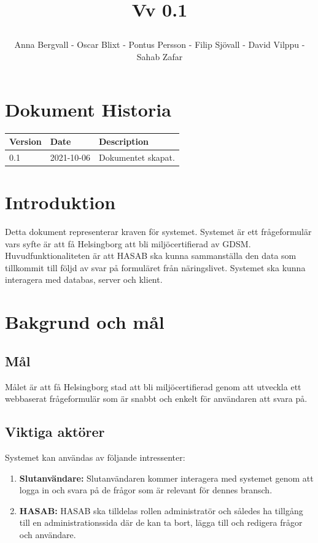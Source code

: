 \documentclass{article}
\date {#1}
\title {
    \documentNumber {01}    

    \documentTitle {Helsingborg Event and Convention Bureau}
    
    \documentDate {2021-08-20}
    \documentVersion Vv 0.1
    
    \author{Anna Bergvall - Oscar Blixt - Pontus Persson - Filip Sjövall - David Vilppu - Sahab Zafar}
}
\begin{document}
\maketitle

\thispagestyle{empty}



\newpage

\tableofcontents


\newpage

\section{Dokument Historia}
\begin{tabular}{ l | l | l }
    Version & Date & Description \\
    \hline
    0.1 & 2021-10-06 & Dokumentet skapat. \\
    
\end{tabular}

\section{Introduktion}
    Detta dokument representerar kraven för systemet. Systemet är ett frågeformulär vars syfte är att få Helsingborg att bli miljöcertifierad av GDSM. Huvudfunktionaliteten är att HASAB ska kunna sammanställa den data som tillkommit till följd av svar på formuläret från näringslivet. Systemet ska kunna interagera med databas, server och klient.
    

\section{Bakgrund och mål}

    \subsection{Mål}
       Målet är att få Helsingborg stad att bli miljöcertifierad genom att utveckla ett webbaserat frågeformulär som är snabbt och enkelt för användaren att svara på.
        
    \subsection{Viktiga aktörer}
    Systemet kan användas av följande intressenter:
    \begin{enumerate}
        \item \textbf{Slutanvändare:} Slutanvändaren kommer interagera med systemet genom att logga in och svara på de frågor som är relevant för dennes bransch.
        \item \textbf{HASAB:} HASAB ska tilldelas rollen administratör och således ha tillgång till en administrationssida där de kan ta bort, lägga till och redigera frågor och användare.
    \end{enumerate}
    
\end{document}
